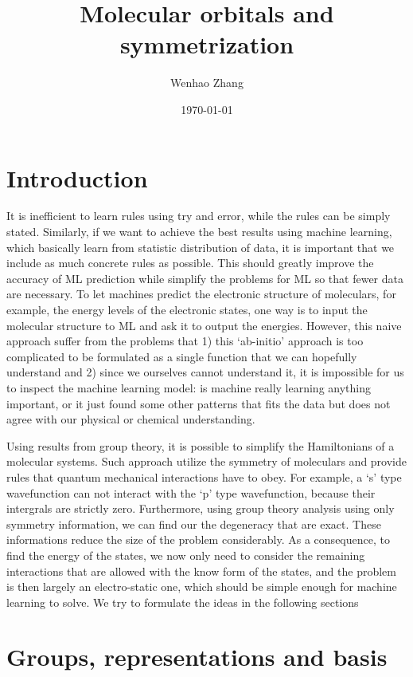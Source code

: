 \documentclass{article}
\begin{document}
\title{Molecular orbitals and symmetrization}
\author{Wenhao Zhang}
\date{\today}
\maketitle

\section{Introduction}

It is inefficient to learn rules using try and error, while the rules can be 
simply stated. 
Similarly, if we want to achieve the best results using machine learning, which 
basically learn from statistic distribution of data, 
it is important that we include as much concrete rules as possible. 
This should greatly improve the accuracy of ML prediction while simplify the 
problems for ML so that fewer data are necessary.
To let machines predict the electronic structure of moleculars, for example, the 
energy levels of the electronic states, 
one way is to input the molecular structure to ML and ask it to output the energies. 
However, this naive approach suffer from the problems that 1) this `ab-initio' approach
is too complicated to be formulated as a single function that we can hopefully understand 
and 2) since we ourselves cannot understand it, it is impossible for us to inspect the 
machine learning model: is machine really learning anything important, or it just 
found some other patterns that fits the data but does not agree with our physical 
or chemical understanding. 

Using results from group theory, it is possible to simplify the Hamiltonians of 
a molecular systems. Such approach utilize the symmetry of moleculars and provide
rules that quantum mechanical interactions have to obey. 
For example, a `s' type wavefunction can not interact with the `p' type wavefunction,
because their intergrals are strictly zero. 
Furthermore, using group theory analysis using only symmetry information, we can find 
our the degeneracy that are exact. 
These informations reduce the size of the problem considerably. As a consequence, to 
find the energy of the states, we now only need to consider the remaining interactions 
that are allowed with the know form of the states, and the problem is then largely 
an electro-static one, which should be simple enough for machine learning to solve.
We try to formulate the ideas in the following sections

\section{Groups, representations and basis}
\end{document}
